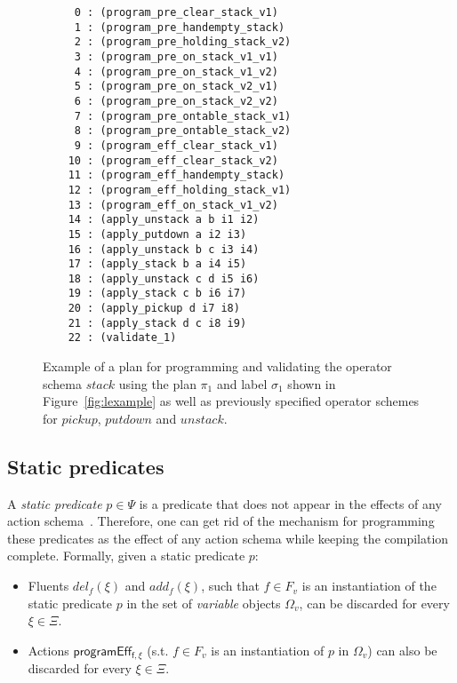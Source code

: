 \documentclass[letterpaper]{article} %
\begin{document}
\begin{figure}
\begin{small}
\begin{verbatim}
     0 : (program_pre_clear_stack_v1)
     1 : (program_pre_handempty_stack)
     2 : (program_pre_holding_stack_v2)
     3 : (program_pre_on_stack_v1_v1)
     4 : (program_pre_on_stack_v1_v2)
     5 : (program_pre_on_stack_v2_v1)
     6 : (program_pre_on_stack_v2_v2)
     7 : (program_pre_ontable_stack_v1)
     8 : (program_pre_ontable_stack_v2)
     9 : (program_eff_clear_stack_v1)
    10 : (program_eff_clear_stack_v2)
    11 : (program_eff_handempty_stack)
    12 : (program_eff_holding_stack_v1)
    13 : (program_eff_on_stack_v1_v2)
    14 : (apply_unstack a b i1 i2)
    15 : (apply_putdown a i2 i3)
    16 : (apply_unstack b c i3 i4)
    17 : (apply_stack b a i4 i5)
    18 : (apply_unstack c d i5 i6)
    19 : (apply_stack c b i6 i7)
    20 : (apply_pickup d i7 i8)
    21 : (apply_stack d c i8 i9)
    22 : (validate_1)
\end{verbatim}
\end{small}
 \caption{\small Example of a plan for programming and validating the operator schema $stack$ using the plan $\pi_1$ and label $\sigma_1$ shown in Figure~\ref{fig:lexample} as well as previously specified operator schemes for $pickup$, $putdown$ and $unstack$.}
\label{fig:plan}
\end{figure}

\subsection{Static predicates}
A {\em static predicate} $p \in \Psi$ is a predicate that does not appear in the effects of any action schema~\cite{fox:TIM:JAIR1998}. Therefore, one can get rid of the mechanism for programming these predicates as the effect of any action schema while keeping the compilation complete. Formally, given a static predicate $p$:
\begin{itemize}
\item Fluents $del_f(\xi)$ and $add_f(\xi)$, such that $f\in F_v$ is an instantiation of the static predicate $p$ in the set of {\em variable} objects $\Omega_v$, can be discarded for every $\xi\in\Xi$.
\item Actions $\mathsf{programEff_{f,\xi}}$ (s.t. $f\in F_v$ is an instantiation of $p$ in $\Omega_v$) can also be discarded for every $\xi\in\Xi$.
\end{itemize}
\end{document}
